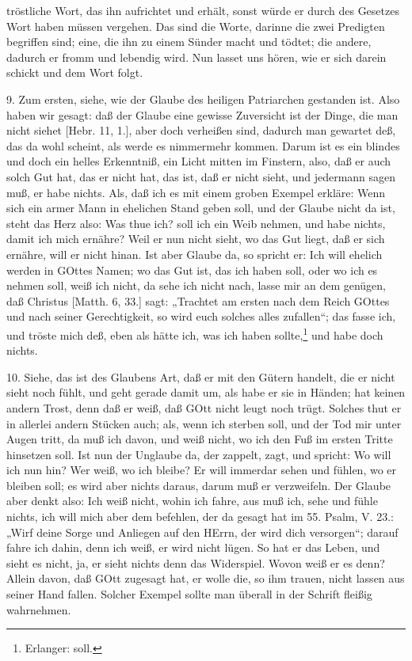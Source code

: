 tröstliche Wort, das ihn aufrichtet und erhält, sonst würde er durch des Gesetzes Wort haben müssen vergehen. Das sind die Worte, darinne die zwei Predigten begriffen sind; eine, die ihn zu einem Sünder macht und tödtet; die andere, dadurch er fromm und lebendig wird. Nun lasset uns hören, wie er sich darein schickt und dem Wort folgt.

9. Zum ersten, siehe, wie der Glaube des heiligen Patriarchen gestanden ist. Also haben wir gesagt: daß der Glaube eine gewisse Zuversicht ist der Dinge, die man nicht siehet [Hebr. 11, 1.], aber doch verheißen sind, dadurch man gewartet deß, das da wohl scheint, als werde es nimmermehr kommen. Darum ist es ein blindes und doch ein helles Erkenntniß, ein Licht mitten im Finstern, also, daß er auch solch Gut hat, das er nicht hat, das ist, daß er nicht sieht, und jedermann sagen muß, er habe nichts. Als, daß ich es mit einem groben Exempel erkläre: Wenn sich ein armer Mann in ehelichen Stand geben soll, und der Glaube nicht da ist, steht das Herz also: Was thue ich? soll ich ein Weib nehmen, und habe nichts, damit ich mich ernähre? Weil er nun nicht sieht, wo das Gut liegt, daß er sich ernähre, will er nicht hinan. Ist aber Glaube da, so spricht er: Ich will ehelich werden in GOttes Namen; wo das Gut ist, das ich haben soll, oder wo ich es nehmen soll, weiß ich nicht, da sehe ich nicht nach, lasse mir an dem genügen, daß Christus [Matth. 6, 33.] sagt: „Trachtet am ersten nach dem Reich GOttes und nach seiner Gerechtigkeit, so wird euch solches alles zufallen“; das fasse ich, und tröste mich deß, eben als hätte ich, was ich haben sollte,\footnote{Erlanger: soll.} und habe doch nichts.

10. Siehe, das ist des Glaubens Art, daß er mit den Gütern handelt, die er nicht sieht noch fühlt, und geht gerade damit um, als habe er sie in Händen; hat keinen andern Trost, denn daß er weiß, daß GOtt nicht leugt noch trügt. Solches thut er in allerlei andern Stücken auch; als, wenn ich sterben soll, und der Tod mir unter Augen tritt, da muß ich davon, und weiß nicht, wo ich den Fuß im ersten Tritte hinsetzen soll. Ist nun der Unglaube da, der zappelt, zagt, und spricht: Wo will ich nun hin? Wer weiß, wo ich bleibe? Er will immerdar sehen und fühlen, wo er bleiben soll; es wird aber nichts daraus, darum muß er verzweifeln. Der Glaube aber denkt also: Ich weiß nicht, wohin ich fahre, aus muß ich, sehe und fühle nichts, ich will mich aber dem befehlen, der da gesagt hat im 55. Psalm, V. 23.: „Wirf deine Sorge und Anliegen auf den HErrn, der wird dich versorgen“; darauf fahre ich dahin, denn ich weiß, er wird nicht lügen. So hat er das Leben, und sieht es nicht, ja, er sieht nichts denn das Widerspiel. Wovon weiß er es denn? Allein davon, daß GOtt zugesagt hat, er wolle die, so ihm trauen, nicht lassen aus seiner Hand fallen. Solcher Exempel sollte man überall in der Schrift fleißig wahrnehmen.

